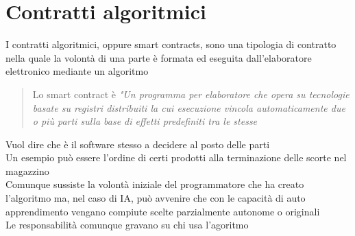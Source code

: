 \documentclass[8pt,oneside,a4paper]{article}
\begin{document}
	\section{Contratti algoritmici}
	I contratti algoritmici, oppure smart contracts, sono una tipologia di contratto nella quale la volontà di una parte è formata ed eseguita dall'elaboratore elettronico mediante un algoritmo\\
	\begin{quote}
		Lo smart contract è \textit{"Un programma per elaboratore che opera su tecnologie basate su registri distribuiti la cui esecuzione vincola automaticamente due o più parti sulla base di effetti predefiniti tra le stesse}
	\end{quote}
	Vuol dire che è il software stesso a decidere al posto delle parti\\
	Un esempio può essere l'ordine di certi prodotti alla terminazione delle scorte nel magazzino\\
	Comunque sussiste la volontà iniziale del programmatore che ha creato l'algoritmo ma, nel caso di IA, può avvenire che con le capacità di auto apprendimento vengano compiute scelte parzialmente autonome o originali\\
	Le responsabilità comunque gravano su chi usa l'agoritmo
\end{document}
